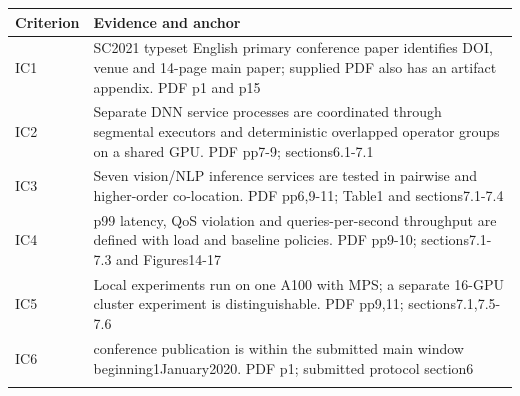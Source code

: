 \begin{longtable}{>{\raggedright\arraybackslash}p{}>{\raggedright\arraybackslash}p{}}
\toprule
\textbf{Criterion} & \textbf{Evidence and anchor}\\\midrule\endhead
IC1 & SC2021 typeset English primary conference paper identifies DOI,\allowbreak{} venue and 14-page main paper;\allowbreak{} supplied PDF also has an artifact appendix. PDF p1 and p15\\\addlinespace
IC2 & Separate DNN service processes are coordinated through segmental executors and deterministic overlapped operator groups on a shared GPU. PDF pp7-9;\allowbreak{} sections6.1-7.1\\\addlinespace
IC3 & Seven vision/NLP inference services are tested in pairwise and higher-order co-location. PDF pp6,\allowbreak{}9-11;\allowbreak{} Table1 and sections7.1-7.4\\\addlinespace
IC4 & p99 latency,\allowbreak{} QoS violation and queries-per-second throughput are defined with load and baseline policies. PDF pp9-10;\allowbreak{} sections7.1-7.3 and Figures14-17\\\addlinespace
IC5 & Local experiments run on one A100 with MPS;\allowbreak{} a separate 16-GPU cluster experiment is distinguishable. PDF pp9,\allowbreak{}11;\allowbreak{} sections7.1,\allowbreak{}7.5-7.6\\\addlinespace
IC6 & 2021 conference publication is within the submitted main window beginning1January2020. PDF p1;\allowbreak{} submitted protocol section6\\\addlinespace
\bottomrule\end{longtable}
